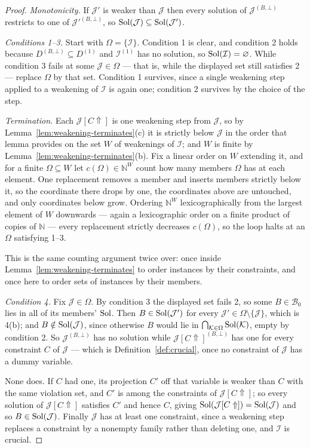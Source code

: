 \begin{proof}
\emph{Monotonicity.} If $\mathcal J'$ is weaker than $\mathcal J$ then every
solution of $\mathcal J^{(B,\bot)}$ restricts to one of
$\mathcal J'^{(B,\bot)}$, so $\operatorname{Sol}(\mathcal J)\subseteq\operatorname{Sol}(\mathcal J')$.

\emph{Conditions 1--3.} Start with $\Omega=\{\mathcal I\}$. Condition 1 is
clear, and condition 2 holds because $D^{(B,\bot)}\subseteq D^{(1)}$ and
$\mathcal I^{(1)}$ has no solution, so $\operatorname{Sol}(\mathcal I)=\varnothing$. While
condition 3 fails at some $\mathcal J\in\Omega$ --- that is, while the
displayed set still satisfies 2 --- replace $\Omega$ by that set. Condition 1
survives, since a single weakening step applied to a weakening of $\mathcal I$
is again one; condition 2 survives by the choice of the step.

\emph{Termination.} Each $\mathcal J[C\Uparrow]$ is one weakening step from
$\mathcal J$, so by Lemma~\ref{lem:weakening-terminates}(c) it is strictly
below $\mathcal J$ in the order that lemma provides on the set $W$ of
weakenings of $\mathcal I$; and $W$ is finite by
Lemma~\ref{lem:weakening-terminates}(b). Fix a linear order on $W$ extending
it, and for a finite $\Omega\subseteq W$ let $c(\Omega)\in\mathbb N^{W}$ count
how many members $\Omega$ has at each element. One replacement removes a member
and inserts members strictly below it, so the coordinate there drops by one,
the coordinates above are untouched, and only coordinates below grow. Ordering
$\mathbb N^{W}$ lexicographically from the largest element of $W$ downwards ---
again a lexicographic order on a finite product of copies of $\mathbb N$ ---
every replacement strictly decreases $c(\Omega)$, so the loop halts at an
$\Omega$ satisfying 1--3.

This is the same counting argument twice over: once inside
Lemma~\ref{lem:weakening-terminates} to order instances by their constraints,
and once here to order sets of instances by their members.

\emph{Condition 4.} Fix $\mathcal J\in\Omega$. By condition 3 the displayed set
fails 2, so some $B\in\mathcal B_{0}$ lies in all of its members' $\operatorname{Sol}$. Then
$B\in\operatorname{Sol}(\mathcal J')$ for every $\mathcal J'\in\Omega\setminus
\{\mathcal J\}$, which is 4(b); and $B\notin\operatorname{Sol}(\mathcal J)$, since otherwise
$B$ would lie in $\bigcap_{\mathcal K\in\Omega}\operatorname{Sol}(\mathcal K)$, empty by
condition 2. So $\mathcal J^{(B,\bot)}$ has no solution while
$\mathcal J[C\Uparrow]^{(B,\bot)}$ has one for every constraint $C$ of
$\mathcal J$ --- which is Definition~\ref{def:crucial}, once no constraint of
$\mathcal J$ has a dummy variable.

None does. If $C$ had one, its projection $C'$ off that variable is weaker than
$C$ with the same violation set, and $C'$ is among the constraints of
$\mathcal J[C\Uparrow]$; so every solution of $\mathcal J[C\Uparrow]$ satisfies
$C'$ and hence $C$, giving $\operatorname{Sol}(\mathcal J[C\Uparrow])=\operatorname{Sol}(\mathcal J)$ and
so $B\in\operatorname{Sol}(\mathcal J)$. Finally $\mathcal J$ has at least one constraint,
since a weakening step replaces a constraint by a nonempty family rather than
deleting one, and $\mathcal I$ is crucial.
\end{proof}

